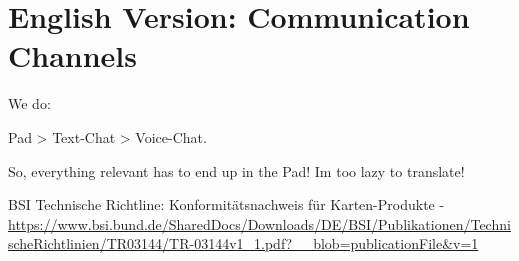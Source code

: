 \documentclass[12pt,a4paper,oneside]{book}
\theoremstyle{plain}
\numberwithin{equation}{chapter} \DeclareMathOperator{\Var}{Var}
\begin{document}
\chapter{English Version: Communication Channels}
We do:

\begin{center}
Pad > Text-Chat > Voice-Chat.
\end{center}

So, everything relevant has to end up in the Pad! Im too lazy to translate!

\begin{thebibliography}{99}
BSI Technische Richtline: Konformitätsnachweis für Karten-Produkte - \url{https://www.bsi.bund.de/SharedDocs/Downloads/DE/BSI/Publikationen/TechnischeRichtlinien/TR03144/TR-03144v1_1.pdf?__blob=publicationFile&v=1}
\end{thebibliography}
\end{document}

